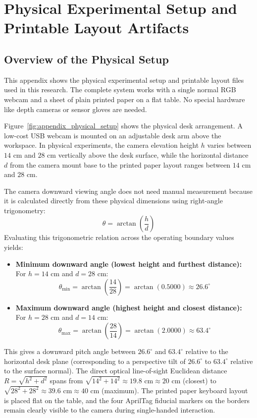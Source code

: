 \chapter{Physical Experimental Setup and Printable Layout Artifacts}
\label{ch:appendix_physical_setup}

\section{Overview of the Physical Setup}
\label{sec:appendix_setup_overview}
This appendix shows the physical experimental setup and printable layout files used in this research. The complete system works with a single normal RGB webcam and a sheet of plain printed paper on a flat table. No special hardware like depth cameras or sensor gloves are needed.

Figure~\ref{fig:appendix_physical_setup} shows the physical desk arrangement. A low-cost USB webcam is mounted on an adjustable desk arm above the workspace. In physical experiments, the camera elevation height $h$ varies between $14\text{ cm}$ and $28\text{ cm}$ vertically above the desk surface, while the horizontal distance $d$ from the camera mount base to the printed paper layout ranges between $14\text{ cm}$ and $28\text{ cm}$.

The camera downward viewing angle does not need manual measurement because it is calculated directly from these physical dimensions using right-angle trigonometry:
\begin{equation}
\theta = \arctan\left(\frac{h}{d}\right)
\label{eq:appendix_camera_tilt_trig}
\end{equation}
Evaluating this trigonometric relation across the operating boundary values yields:
\begin{itemize}
    \item \textbf{Minimum downward angle (lowest height and furthest distance):} For $h = 14\text{ cm}$ and $d = 28\text{ cm}$:
    \begin{equation}
    \theta_{\min} = \arctan\left(\frac{14}{28}\right) = \arctan(0.5000) \approx 26.6^\circ
    \end{equation}
    \item \textbf{Maximum downward angle (highest height and closest distance):} For $h = 28\text{ cm}$ and $d = 14\text{ cm}$:
    \begin{equation}
    \theta_{\max} = \arctan\left(\frac{28}{14}\right) = \arctan(2.0000) \approx 63.4^\circ
    \end{equation}
\end{itemize}
This gives a downward pitch angle between $26.6^\circ$ and $63.4^\circ$ relative to the horizontal desk plane (corresponding to a perspective tilt of $26.6^\circ$ to $63.4^\circ$ relative to the surface normal). The direct optical line-of-sight Euclidean distance $R = \sqrt{h^2 + d^2}$ spans from $\sqrt{14^2 + 14^2} \approx 19.8\text{ cm} \approx 20\text{ cm}$ (closest) to $\sqrt{28^2 + 28^2} \approx 39.6\text{ cm} \approx 40\text{ cm}$ (maximum). The printed paper keyboard layout is placed flat on the table, and the four AprilTag fiducial markers on the borders remain clearly visible to the camera during single-handed interaction.


